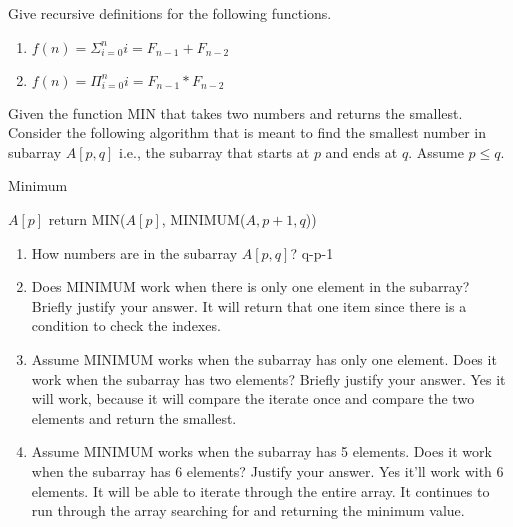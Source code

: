 \documentclass[12pt]{article}
\newenvironment{problem}[2][Problem]{\begin{trivlist}
\item[\hskip \labelsep {\bfseries #1}\hskip \labelsep {\bfseries #2.}]}{\end{trivlist}}
\begin{document}
\begin{problem}{8}
Give recursive definitions for the following functions.
\begin{enumerate}
\item $f(n) = \Sigma_{i=0}^{n}i = F_{n-1} + F_{n-2}$
\item $f(n) = \Pi_{i=0}^{n}i = F_{n-1}*F_{n-2}$
\end{enumerate}
\end{problem}

\begin{problem}{9}
Given the function MIN that takes two numbers and returns the smallest. Consider the following
algorithm that is meant to find the smallest number in  subarray $A[p,q]$ i.e., the subarray that starts at $p$ and ends at $q$. Assume $p \leq q$.
\begin{algorithm}
 \caption{Minimum}
 \begin{algorithmic}[H]
    \State \Return $A[p]$
  \Else
    \State return MIN($A[p]$, MINIMUM($A,p+1,q$))
  \EndIf
 \EndProcedure
\end{algorithmic}
\end{algorithm}

\begin{enumerate}
 \item How numbers are in the subarray $A[p,q]$? q-p-1
 \item Does MINIMUM work when there is only one element in the subarray? Briefly justify your 
 answer. It will return that one item since there is a condition to check the indexes.
 \item Assume MINIMUM works when the subarray has only one element. Does it work when the 
 subarray has two elements? Briefly justify your answer. Yes it will work, because it will compare the iterate once and compare the two elements and return the smallest.
 \item Assume MINIMUM works when the subarray has 5 elements. Does it work when the 
 subarray has 6 elements? Justify your answer. Yes it'll work with 6 elements. It will be able to iterate through the entire array. It continues to run through the array searching for and returning the minimum value. 
  
\end{enumerate}
\end{problem}
\end{document}
